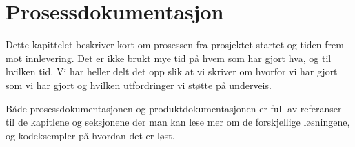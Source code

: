 \chapter{Prosessdokumentasjon}
Dette kapittelet beskriver kort om prosessen fra prosjektet startet og tiden frem mot innlevering. Det er ikke brukt mye tid på hvem som har gjort hva, og til hvilken tid. Vi har heller delt det opp slik at vi skriver om hvorfor vi har gjort som vi har gjort og hvilken utfordringer vi støtte på underveis. 



Både prosessdokumentasjonen og produktdokumentasjonen er full av referanser til de kapitlene og seksjonene der man kan lese mer om de forskjellige løsningene, og kodeksempler på hvordan det er løst.

